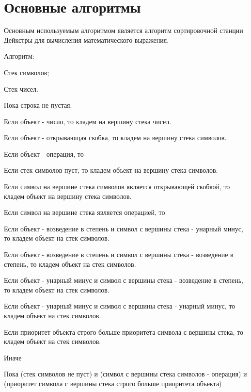 \documentclass[a4paper,14pt]{extarticle}
\begin{document}
\section{Основные алгоритмы}
Основным используемым алгоритмом является алгоритм сортировочной станции Дейкстры для вычисления математического выражения.

Алгоритм:

Стек символов;

Стек чисел.

Пока строка не пустая:

	{\setlength{\leftskip}{2em}
	
	Если объект - число, то кладем на вершину стека чисел.
	
	Если объект - открывающая скобка, то кладем на вершину стека символов.
	
	Если объект - операция, то
	
		{\setlength{\leftskip}{4em}
		
		Если стек символов пуст, то кладем объект на вершину стека символов.
		
		Если символ на вершине стека символов является открывающей скобкой, то кладем объект на вершину стека символов.
		
		Если символ на вершине стека является операцией, то
		
			{\setlength{\leftskip}{6em}
			
			Если объект - возведение в степень и символ с вершины стека - унарный минус, то кладем объект на стек символов.
			
			Если объект - возведение в степень и символ с вершины стека - возведение в степень, то кладем объект на стек символов.
			
			Если объект - унарный минус и символ с вершины стека - возведение в степень, то кладем объект на стек символов.
			
			Если объект - унарный минус и символ с вершины стека - унарный минус, то кладем объект на стек символов.
			
			Если приоритет объекта строго больше приоритета символа с вершины стека, то кладем объект на стек символов.
			
			Иначе {
			
				\setlength{\leftskip}{8em}
				Пока (стек символов не пуст) и (символ с вершины стека символов - операция) и (приоритет символа с вершины стека строго больше приоритета объекта)
				
}}}}
\end{document}
